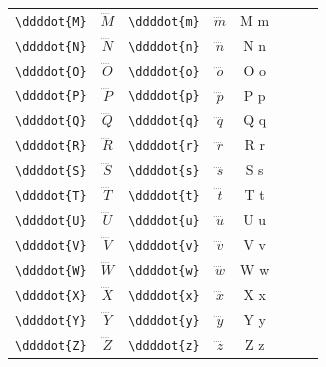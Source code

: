 \documentclass[12pt,a4paper]{article}
\begin{document}
\begin{longtable}{|l|c|l|c|c|l|c|c|}
\verb|\ddddot{M}| & $\ddddot{M}$    & \verb|\ddddot{m}| & $\ddddot{m}$    & M⃜ m⃜            &                   &                 & \\
\verb|\ddddot{N}| & $\ddddot{N}$    & \verb|\ddddot{n}| & $\ddddot{n}$    & N⃜ n⃜            &                   &                 & \\
\verb|\ddddot{O}| & $\ddddot{O}$    & \verb|\ddddot{o}| & $\ddddot{o}$    & O⃜ o⃜            &                   &                 & \\
\verb|\ddddot{P}| & $\ddddot{P}$    & \verb|\ddddot{p}| & $\ddddot{p}$    & P⃜ p⃜            &                   &                 & \\
\verb|\ddddot{Q}| & $\ddddot{Q}$    & \verb|\ddddot{q}| & $\ddddot{q}$    & Q⃜ q⃜            &                   &                 & \\
\verb|\ddddot{R}| & $\ddddot{R}$    & \verb|\ddddot{r}| & $\ddddot{r}$    & R⃜ r⃜            &                   &                 & \\
\verb|\ddddot{S}| & $\ddddot{S}$    & \verb|\ddddot{s}| & $\ddddot{s}$    & S⃜ s⃜            &                   &                 & \\
\verb|\ddddot{T}| & $\ddddot{T}$    & \verb|\ddddot{t}| & $\ddddot{t}$    & T⃜ t⃜            &                   &                 & \\
\verb|\ddddot{U}| & $\ddddot{U}$    & \verb|\ddddot{u}| & $\ddddot{u}$    & U⃜ u⃜            &                   &                 & \\
\verb|\ddddot{V}| & $\ddddot{V}$    & \verb|\ddddot{v}| & $\ddddot{v}$    & V⃜ v⃜            &                   &                 & \\
\verb|\ddddot{W}| & $\ddddot{W}$    & \verb|\ddddot{w}| & $\ddddot{w}$    & W⃜ w⃜            &                   &                 & \\
\verb|\ddddot{X}| & $\ddddot{X}$    & \verb|\ddddot{x}| & $\ddddot{x}$    & X⃜ x⃜            &                   &                 & \\
\verb|\ddddot{Y}| & $\ddddot{Y}$    & \verb|\ddddot{y}| & $\ddddot{y}$    & Y⃜ y⃜            &                   &                 & \\
\verb|\ddddot{Z}| & $\ddddot{Z}$    & \verb|\ddddot{z}| & $\ddddot{z}$    & Z⃜ z⃜            &                   &                 & \\
\hline
\end{longtable}

\newpage
\end{document}
